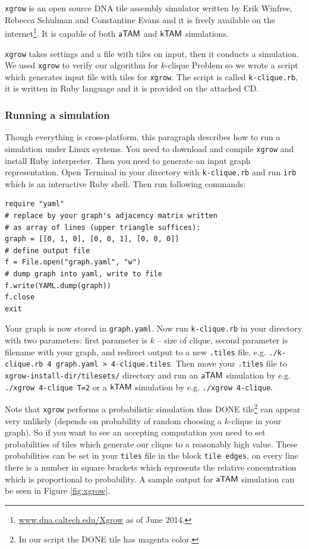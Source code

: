 {\tt xgrow} is an open source DNA tile assembly simulator written by Erik Winfree, Rebecca Schulman and Constantine Evans and it is freely available on the internet\footnote{\url{www.dna.caltech.edu/Xgrow} as of June 2014.}. It is capable of both $\mathsf{aTAM}$ and $\mathsf{kTAM}$ simulations.


{\tt xgrow} takes settings and a file with tiles on input, then it conducts a simulation. We used {\tt xgrow} to verify our algorithm for $k$-clique Problem so we wrote a script which generates input file with tiles for {\tt xgrow}. The script is called {\tt k-clique.rb}, it is written in Ruby language and it is provided on the attached CD.

\subsubsection*{Running a simulation}

Though everything is cross-platform, this paragraph describes how to run a simulation under Linux systems. You need to download and compile {\tt xgrow} and install Ruby interpreter. Then you need to generate an input graph representation. Open Terminal in your directory with {\tt k-clique.rb} and run {\tt irb} which is an interactive Ruby shell. Then run following commands:
\begin{verbatim}
require "yaml"
# replace by your graph's adjacency matrix written
# as array of lines (upper triangle suffices):
graph = [[0, 1, 0], [0, 0, 1], [0, 0, 0]]
# define output file
f = File.open("graph.yaml", "w")
# dump graph into yaml, write to file
f.write(YAML.dump(graph))
f.close
exit
\end{verbatim}
Your graph is now stored in {\tt graph.yaml}. Now run {\tt k-clique.rb} in your directory with two parameters: first parameter is $k$ -- size of clique, second parameter is filename with your graph, and redirect output to a new {\tt *.tiles} file, e.g. {\tt ./k-clique.rb 4 graph.yaml > 4-clique.tiles}. Then move your {\tt *.tiles} file to {\tt xgrow-install-dir/tilesets/} directory and run an $\mathsf{aTAM}$ simulation by e.g. {\tt ./xgrow 4-clique T=2} or a $\mathsf{kTAM}$ simulation by e.g. {\tt ./xgrow 4-clique}.

Note that {\tt xgrow} performs a probabilistic simulation thus DONE tile\footnote{In our script the DONE tile has magenta color.} can appear very unlikely (depends on probability of random choosing a $k$-clique in your graph). So if you want to see an accepting computation you need to set probabilities of tiles which generate our clique to a reasonably high value. These probabilities can be set in your {\tt tiles} file in the block {\tt tile edges}, on every line there is a number in square brackets which represents the relative concentration which is proportional to probability. A sample output for $\mathsf{aTAM}$ simulation can be seen in Figure \ref{fig:xgrow}.

